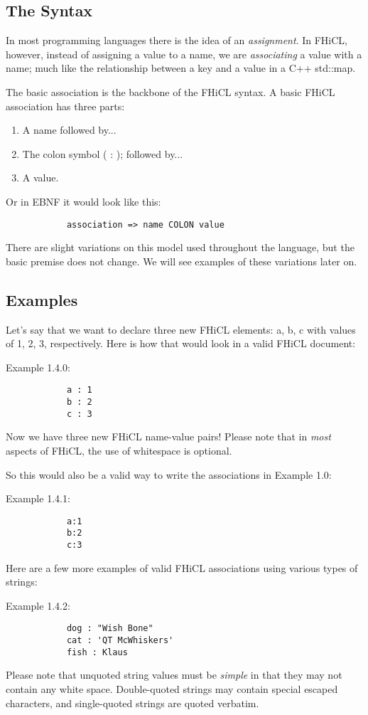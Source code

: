 \documentclass{article}
\begin{document}
	\subsection{The Syntax}
		In most programming languages there is the idea of an \emph{assignment}. 
		In FHiCL, however, instead of assigning a value to a name, 
		we are \emph{associating} a value with a name; 
		much like the relationship between a key and a value in a C++ std::map.
		\par
		The basic association is the backbone of the FHiCL syntax.
		A basic FHiCL association has three parts:
		\begin{enumerate}
			\item A name followed by...
			\item The colon symbol ( : ); followed by...
			\item A value.
		\end{enumerate}
		\par
		Or in EBNF it would look like this:
		\begin{verbatim}
			association => name COLON value
		\end{verbatim}
		\par
		There are slight variations on this model used throughout the language,
		but the basic premise does not change. 
		We will see examples of these variations later on.
	\subsection{Examples}
		Let's say that we want to declare three new FHiCL elements: a, b, c
		with values of 1, 2, 3, respectively. 
		Here is how that would look in a valid FHiCL document:
		\par
		Example 1.4.0:
		\begin{verbatim}
			a : 1
			b : 2
			c : 3
		\end{verbatim}
		\par
		Now we have three new FHiCL name-value pairs!
		Please note that in \emph{most} aspects of FHiCL,
		the use of whitespace is optional.
		\par
		So this would also be a valid way to write the associations in Example 1.0:
		\par
		Example 1.4.1:
		\begin{verbatim}
			a:1
			b:2
			c:3
		\end{verbatim} 
 		\par
		Here are a few more examples of valid FHiCL associations using various types of strings:
		\par
		Example 1.4.2:
		\begin{verbatim}
			dog : "Wish Bone"
			cat : 'QT McWhiskers'
			fish : Klaus
		\end{verbatim}
		Please note that unquoted string values must be \emph{simple} in that they may not contain
		any white space.
		Double-quoted strings may contain special escaped characters,
		and single-quoted strings are quoted verbatim.
\end{document}
